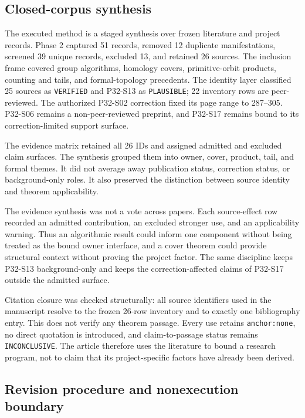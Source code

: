 \documentclass[11pt]{article}
\begin{document}
\hypertarget{31-closed-corpus-synthesis}{%
\subsection{Closed-corpus
synthesis}\label{31-closed-corpus-synthesis}}

The executed method is a staged synthesis over frozen literature and
project records. Phase 2 captured 51 records, removed 12 duplicate
manifestations, screened 39 unique records, excluded 13, and retained 26
sources. The inclusion frame covered group algorithms, homology covers,
primitive-orbit products, counting and tails, and formal-topology
precedents. The identity layer classified 25 sources as
\texttt{VERIFIED} and P32-S13 as \texttt{PLAUSIBLE}; 22 inventory rows
are peer-reviewed. The authorized P32-S02 correction fixed its page
range to 287--305. P32-S06 remains a non-peer-reviewed preprint, and
P32-S17 remains bound to its correction-limited support surface.

The evidence matrix retained all 26 IDs and assigned admitted and
excluded claim surfaces. The synthesis grouped them into owner, cover,
product, tail, and formal themes. It did not average away publication
status, correction status, or background-only roles. It also preserved
the distinction between source identity and theorem applicability.

The evidence synthesis was not a vote across papers. Each source-effect
row recorded an admitted contribution, an excluded stronger use, and an
applicability warning. Thus an algorithmic result could inform one
component without being treated as the bound owner interface, and a
cover theorem could provide structural context without proving the
project factor. The same discipline keeps P32-S13 background-only and
keeps the correction-affected claims of P32-S17 outside the admitted
surface.

Citation closure was checked structurally: all source identifiers used
in the manuscript resolve to the frozen 26-row inventory and to exactly
one bibliography entry. This does not verify any theorem passage. Every
use retains \texttt{anchor:none}, no direct quotation is introduced,
and claim-to-passage status remains \texttt{INCONCLUSIVE}. The article
therefore uses the literature to bound a research program, not to claim
that its project-specific factors have already been derived.

\hypertarget{32-revision-procedure-and-nonexecution-boundary}{%
\subsection{Revision procedure and nonexecution
boundary}\label{32-revision-procedure-and-nonexecution-boundary}}
\end{document}

